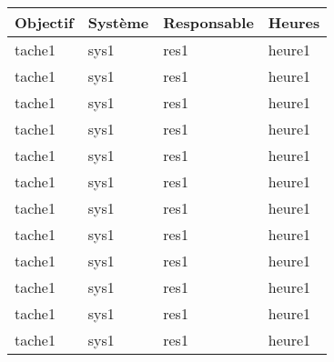 \begin{tabularx}{\linewidth}{
    |>{\hsize=2.5\hsize}X|%
    >{\hsize=0.5\hsize}X|%
    >{\hsize=0.75\hsize}X|%
    >{\hsize=0.25\hsize}X|%
  }
    \hline
    \textbf{Objectif} & \textbf{Système} & \textbf{Responsable} & \textbf{Heures}\\\hline
    tache1 & sys1 & res1 & heure1\\\hline
    tache1 & sys1 & res1 & heure1\\\hline
    tache1 & sys1 & res1 & heure1\\\hline
    tache1 & sys1 & res1 & heure1\\\hline
    tache1 & sys1 & res1 & heure1\\\hline
    tache1 & sys1 & res1 & heure1\\\hline
    tache1 & sys1 & res1 & heure1\\\hline
    tache1 & sys1 & res1 & heure1\\\hline
    tache1 & sys1 & res1 & heure1\\\hline
    tache1 & sys1 & res1 & heure1\\\hline
    tache1 & sys1 & res1 & heure1\\\hline
    tache1 & sys1 & res1 & heure1\\\hline
  \end{tabularx}
     